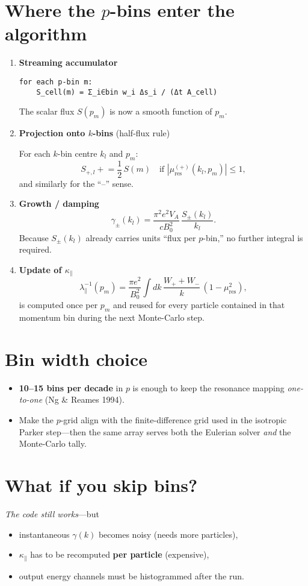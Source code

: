 \section*{Where the \(p\)-bins enter the algorithm}

\begin{enumerate}
\item \textbf{Streaming accumulator}
\begin{verbatim}
for each p-bin m:
    S_cell(m) = Σ_i∈bin w_i Δs_i / (Δt A_cell)
\end{verbatim}
The scalar flux \( S(p_m) \) is now a smooth function of \( p_m \).

\item \textbf{Projection onto \(k\)-bins} (half-flux rule)

For each \(k\)-bin centre \(k_l\) and \(p_m\):
\[
S_{+,l} \mathrel{+}= \frac{1}{2}\,S(m) \quad
\text{if } |\mu_{\text{res}}^{(+)}(k_l,p_m)| \le 1,
\]
and similarly for the “–” sense.

\item \textbf{Growth / damping}
\[
\gamma_\pm(k_l) =
\frac{\pi^2 e^{2} V_A}{c B_0^2}\,
\frac{S_\pm(k_l)}{k_l}.
\]
Because \( S_\pm(k_l) \) already carries units “flux per \(p\)-bin,” no further integral is required.

\item \textbf{Update of \( \kappa_\parallel \)}
\[
\lambda_\parallel^{-1}(p_m) =
\frac{\pi e^{2}}{B_0^{2}}
\int dk\, \frac{W_{+} + W_{-}}{k}\,
\left(1 - \mu_{\text{res}}^2\right),
\]
is computed once per \(p_m\) and reused for every particle contained in that momentum bin during the next Monte-Carlo step.
\end{enumerate}

\section*{Bin width choice}
\begin{itemize}
\item \textbf{10–15 bins per decade} in \(p\) is enough to keep the resonance mapping \emph{one-to-one} (Ng \& Reames 1994).
\item Make the \(p\)-grid align with the finite-difference grid used in the isotropic Parker step—then the same array serves both the Eulerian solver \emph{and} the Monte-Carlo tally.
\end{itemize}

\section*{What if you skip bins?}
\emph{The code still works}—but
\begin{itemize}
\item instantaneous \( \gamma(k) \) becomes noisy (needs more particles),
\item \( \kappa_\parallel \) has to be recomputed \textbf{per particle} (expensive),
\item output energy channels must be histogrammed after the run.
\end{itemize}

